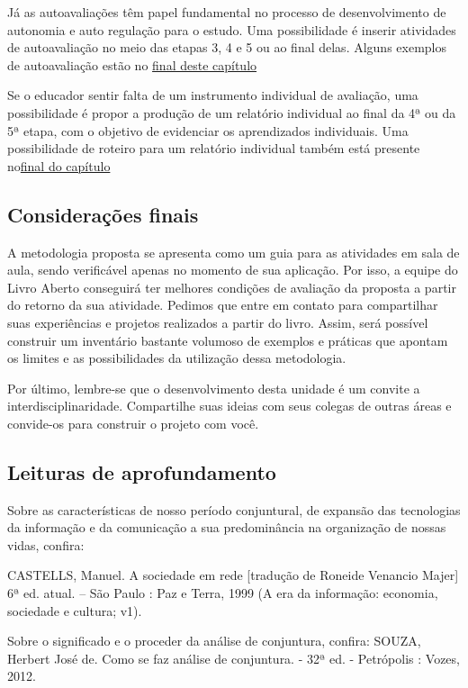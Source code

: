 \begin{apresentacao}
Já as autoavaliações têm papel fundamental no processo de desenvolvimento de autonomia e auto regulação para o estudo. Uma possibilidade é inserir atividades de autoavaliação no meio das etapas 3, 4 e 5 ou ao final delas. Alguns exemplos de autoavaliação estão no \hyperref[avaliacoes]{final deste capítulo}

Se o educador sentir falta de um instrumento individual de avaliação, uma possibilidade é propor a produção de um relatório individual ao final da 4ª ou da 5ª etapa, com o objetivo de evidenciar os aprendizados individuais. Uma possibilidade de roteiro para um relatório individual também está presente no\hyperref[relatorio-individual]{final do capítulo}

\subsection{Considerações finais}

A metodologia proposta se apresenta como um guia para as atividades em sala de aula, sendo verificável apenas no momento de sua aplicação. Por isso, a equipe do Livro Aberto conseguirá ter melhores condições de avaliação da proposta a partir do retorno da sua atividade. Pedimos que entre em contato para compartilhar suas experiências e projetos realizados a partir do livro. Assim, será possível construir um inventário bastante volumoso de exemplos e práticas que apontam os limites e as possibilidades da utilização dessa metodologia.

Por último, lembre-se que o desenvolvimento desta unidade é um convite a interdisciplinaridade. Compartilhe suas ideias com seus colegas de outras áreas e convide-os para construir o projeto com você.

\subsection{Leituras de aprofundamento}

Sobre as características de nosso período conjuntural, de expansão das tecnologias da informação e da comunicação a sua predominância na organização de nossas vidas, confira:

CASTELLS, Manuel. A sociedade em rede [tradução de Roneide Venancio Majer] 6ª ed. atual. – São Paulo : Paz e Terra, 1999 (A era da informação: economia, sociedade e cultura; v1).

Sobre o significado e o proceder da análise de conjuntura, confira:
SOUZA, Herbert José de. Como se faz análise de conjuntura. - 32ª ed. - Petrópolis : Vozes, 2012.

\end{apresentacao}

